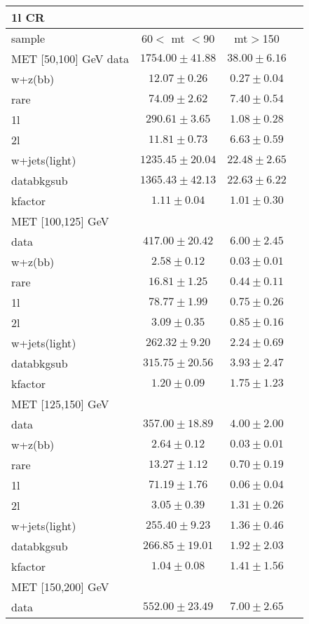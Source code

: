 \begin{table}
\begin{center}
\small
\begin{tabular}{lccc}
\hline
1l CR   & &\\
\hline
sample&60$<$ mt $<$90&mt$>$150\\
\hline
MET [50,100] GeV\hline
data&$1754.00\pm41.88$&$38.00\pm6.16$\\
\hline
w+z(bb)&$12.07\pm0.26$&$0.27\pm0.04$\\
rare&$74.09\pm2.62$&$7.40\pm0.54$\\
1l&$290.61\pm3.65$&$1.08\pm0.28$\\
2l&$11.81\pm0.73$&$6.63\pm0.59$\\
w+jets(light)&$1235.45\pm20.04$&$22.48\pm2.65$\\
\hline
databkgsub&$1365.43\pm42.13$&$22.63\pm6.22$\\
kfactor&$1.11\pm0.04$&$1.01\pm0.30$\\
\hline\hline
\hline
MET [100,125] GeV  & &\\
\hline
data&$417.00\pm20.42$&$6.00\pm2.45$\\
\hline
w+z(bb)&$2.58\pm0.12$&$0.03\pm0.01$\\
rare&$16.81\pm1.25$&$0.44\pm0.11$\\
1l&$78.77\pm1.99$&$0.75\pm0.26$\\
2l&$3.09\pm0.35$&$0.85\pm0.16$\\
w+jets(light)&$262.32\pm9.20$&$2.24\pm0.69$\\
\hline
databkgsub&$315.75\pm20.56$&$3.93\pm2.47$\\
kfactor&$1.20\pm0.09$&$1.75\pm1.23$\\
\hline\hline
\hline
MET [125,150] GeV  & &\\
\hline
data&$357.00\pm18.89$&$4.00\pm2.00$\\
\hline
w+z(bb)&$2.64\pm0.12$&$0.03\pm0.01$\\
rare&$13.27\pm1.12$&$0.70\pm0.19$\\
1l&$71.19\pm1.76$&$0.06\pm0.04$\\
2l&$3.05\pm0.39$&$1.31\pm0.26$\\
w+jets(light)&$255.40\pm9.23$&$1.36\pm0.46$\\
\hline
databkgsub&$266.85\pm19.01$&$1.92\pm2.03$\\
kfactor&$1.04\pm0.08$&$1.41\pm1.56$\\
\hline\hline
\hline
MET [150,200] GeV   & &\\
\hline
data&$552.00\pm23.49$&$7.00\pm2.65$\\

\end{tabular}
\end{center}
\end{table}
